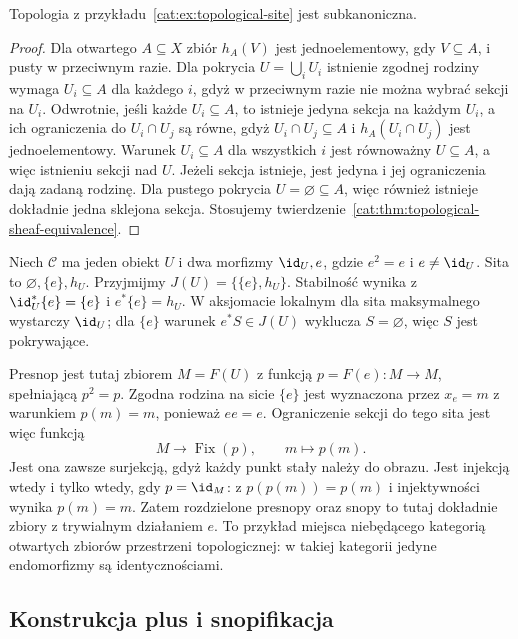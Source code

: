 \begin{stwierdzenie}\label{cat:prop:topological-subcanonical}
Topologia z przykładu~\ref{cat:ex:topological-site} jest subkanoniczna.
\end{stwierdzenie}
\begin{proof}
Dla otwartego $A\subseteq X$ zbiór $h_A(V)$ jest jednoelementowy, gdy $V\subseteq A$, i pusty w przeciwnym razie. Dla pokrycia $U=\bigcup_i U_i$ istnienie zgodnej rodziny wymaga $U_i\subseteq A$ dla każdego $i$, gdyż w przeciwnym razie nie można wybrać sekcji na $U_i$. Odwrotnie, jeśli każde $U_i\subseteq A$, to istnieje jedyna sekcja na każdym $U_i$, a ich ograniczenia do $U_i\cap U_j$ są równe, gdyż $U_i\cap U_j\subseteq A$ i $h_A(U_i\cap U_j)$ jest jednoelementowy. Warunek $U_i\subseteq A$ dla wszystkich $i$ jest równoważny $U\subseteq A$, a więc istnieniu sekcji nad $U$. Jeżeli sekcja istnieje, jest jedyna i jej ograniczenia dają zadaną rodzinę. Dla pustego pokrycia $U=\varnothing\subseteq A$, więc również istnieje dokładnie jedna sklejona sekcja. Stosujemy twierdzenie~\ref{cat:thm:topological-sheaf-equivalence}.
\end{proof}

\begin{przyklad}\label{cat:ex:idempotent-site}
Niech $\mathcal C$ ma jeden obiekt $U$ i dwa morfizmy $\id_U,e$, gdzie $e^2=e$ i $e\ne\id_U$. Sita to $\varnothing,\{e\},h_U$. Przyjmijmy $J(U)=\{\{e\},h_U\}$. Stabilność wynika z $\id_U^*\{e\}=\{e\}$ i $e^*\{e\}=h_U$. W aksjomacie lokalnym dla sita maksymalnego wystarczy $\id_U$; dla $\{e\}$ warunek $e^*S\in J(U)$ wyklucza $S=\varnothing$, więc $S$ jest pokrywające.

Presnop jest tutaj zbiorem $M=F(U)$ z funkcją $p=F(e):M\to M$, spełniającą $p^2=p$. Zgodna rodzina na sicie $\{e\}$ jest wyznaczona przez $x_e=m$ z warunkiem $p(m)=m$, ponieważ $ee=e$. Ograniczenie sekcji do tego sita jest więc funkcją
\[
 M\longrightarrow\operatorname{Fix}(p),\qquad m\longmapsto p(m).
\]
Jest ona zawsze surjekcją, gdyż każdy punkt stały należy do obrazu. Jest injekcją wtedy i tylko wtedy, gdy $p=\id_M$: z $p(p(m))=p(m)$ i injektywności wynika $p(m)=m$. Zatem rozdzielone presnopy oraz snopy to tutaj dokładnie zbiory z trywialnym działaniem $e$. To przykład miejsca niebędącego kategorią otwartych zbiorów przestrzeni topologicznej: w takiej kategorii jedyne endomorfizmy są identycznościami.
\end{przyklad}

\subsection{Konstrukcja plus i snopifikacja}

